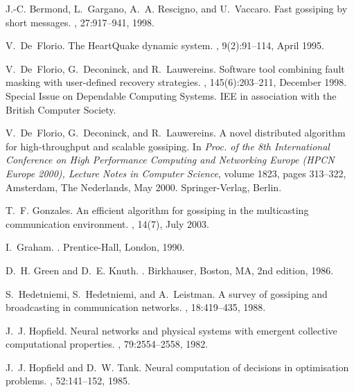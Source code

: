 \documentclass{elsart}
\begin{document}

\begin{thebibliography}{10}\setlength{\itemsep}{-1ex}\small

J.-C. Bermond, L.~Gargano, A.~A. Rescigno, and U.~Vaccaro.
\newblock Fast gossiping by short messages.
, 27:917--941, 1998.

V.~De~Florio.
\newblock The {H}eart{Q}uake dynamic system.
, 9(2):91--114, April 1995.

V.~De~Florio, G.~Deconinck, and R.~Lauwereins.
\newblock Software tool combining fault masking with user-defined recovery
  strategies.
, 145(6):203--211, December 1998.
\newblock Special Issue on Dependable Computing Systems. IEE in association
  with the British Computer Society.

V.~De~Florio, G.~Deconinck, and R.~Lauwereins.
\newblock A novel distributed algorithm for high-throughput and scalable
  gossiping.
\newblock In {\em Proc. of the 8th International Conference on High Performance
  Computing and Networking Europe (HPCN Europe 2000), Lecture Notes in Computer
  Science}, volume 1823, pages 313--322, Amsterdam, The Nederlands, May 2000.
  Springer-Verlag, Berlin.

T.~F. Gonzales.
\newblock An efficient algorithm for gossiping in the multicasting
  communication environment.
, 14(7),
  July 2003.

I.~Graham.
.
\newblock Prentice-Hall, London, 1990.

D.~H. Green and D.~E. Knuth.
.
\newblock Birkhauser, Boston, MA, 2nd edition, 1986.

S.~Hedetniemi, S.~Hedetniemi, and A.~Leistman.
\newblock A survey of gossiping and broadcasting in communication networks.
, 18:419--435, 1988.

J.~J. Hopfield.
\newblock Neural networks and physical systems with emergent collective
  computational properties.
, 79:2554--2558, 1982.

J.~J. Hopfield and D.~W. Tank.
\newblock Neural computation of decisions in optimisation problems.
, 52:141--152, 1985.


\end{thebibliography}
\end{document}
